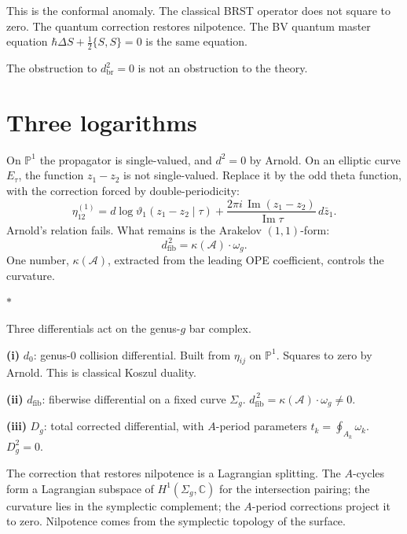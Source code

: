 \documentclass[11pt]{article}
\newcommand{\cA}{\mathcal{A}}
\newcommand{\C}{\mathbb{C}}
\newcommand{\bP}{\mathbb{P}}
\newcommand{\dzero}{d_0}
\newcommand{\dfib}{d_{\mathrm{fib}}}
\newcommand{\Dg}[1]{D_{#1}}
\newcommand{\sep}{\bigskip\begin{center}$*$\end{center}\medskip}
\begin{document}
This is the conformal anomaly.  The classical BRST operator does
not square to zero.  The quantum correction restores nilpotence.
The BV quantum master equation
$\hbar\Delta S + \tfrac{1}{2}\{S,S\} = 0$ is the same equation.

The obstruction to $d_{\mathrm{br}}^2 = 0$ is not an obstruction
to the theory.


\section{Three logarithms}
\label{sec:three-logs}

On $\bP^1$ the propagator is single-valued, and $d^2 = 0$ by
Arnold.  On an elliptic curve $E_\tau$, the function $z_1 - z_2$
is not single-valued.  Replace it by the odd theta function, with
the correction forced by double-periodicity:
\[
\eta^{(1)}_{12} = d\log\vartheta_1(z_1 - z_2 \mid \tau)
  + \frac{2\pi i\,\operatorname{Im}(z_1 - z_2)}
    {\operatorname{Im}\tau}\, d\bar{z}_1.
\]
Arnold's relation fails.  What remains is the Arakelov
$(1,1)$-form:
\begin{equation}\label{eq:curvature}
\dfib^{\,2} = \kappa(\cA) \cdot \omega_g.
\end{equation}
One number, $\kappa(\cA)$, extracted from the leading OPE
coefficient, controls the curvature.

\sep

Three differentials act on the genus-$g$ bar complex.

\medskip
\noindent
\textbf{(i)} $\dzero$: genus-$0$ collision differential.
Built from $\eta_{ij}$ on $\bP^1$.  Squares to zero by Arnold.
This is classical Koszul duality.

\medskip
\noindent
\textbf{(ii)} $\dfib$: fiberwise differential on a fixed curve
$\Sigma_g$.  $\dfib^{\,2} = \kappa(\cA) \cdot \omega_g \neq 0$.

\medskip
\noindent
\textbf{(iii)} $\Dg{g}$: total corrected differential, with
$A$-period parameters $t_k = \oint_{A_k}\omega_k$.
$\Dg{g}^2 = 0$.

\medskip

The correction that restores nilpotence is a Lagrangian
splitting.  The $A$-cycles form a Lagrangian subspace of
$H^1(\Sigma_g, \C)$ for the intersection pairing; the curvature
lies in the symplectic complement; the $A$-period corrections
project it to zero.  Nilpotence comes from the symplectic topology
of the surface.
\end{document}
